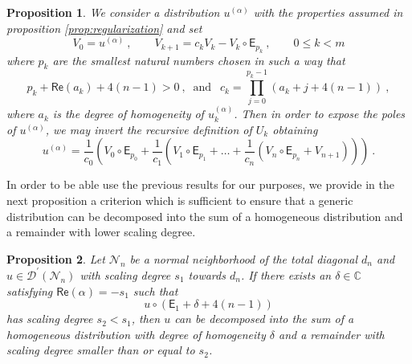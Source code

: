 \documentclass[11pt]{book}
\renewcommand{\Re}{\mathsf{Re}}
\newcommand{\Dcal}{\mathcal{D}}
\newcommand{\Ncal}{\mathcal{N}}
\newcommand{\Cbb}{\mathbb{C}}
\newcommand{\Esf}{\mathsf{E}}
\theoremstyle{break}
\newtheorem{proposition}{Proposition}[chapter]
\begin{document}
\begin{proposition}\label{prop:expose_poles}
We consider a distribution $u^{(\alpha)}$ with the properties assumed in proposition \ref{prop:regularization} and set
%
\begin{equation*}
V_0 = u^{(\alpha)} \ , \qquad V_{k+1} = c_k V_k - V_k \circ \Esf_{p_k} \ , \qquad 0 \leq k < m 
\end{equation*}
%
where $p_k$ are the smallest natural numbers chosen in such a way that 
%
\begin{equation*}
p_k+\Re(a_k)+4(n-1)>0 \ , \ \mbox{ and } \ \ c_k = \prod_{j=0}^{p_k-1} \left(a_k+j+4(n-1)\right) \ ,
\end{equation*}
%
where $a_k$ is the degree of homogeneity of $u^{(\alpha)}_k$. Then in order to expose the poles of $u^{(\alpha)}$, we may invert the recursive definition of $U_k$ obtaining
%
\begin{equation*}
u^{(\alpha)} = \frac{1}{c_0} \left( V_0\circ \Esf_{p_0} +  \frac{1}{c_1} \left( V_1 \circ \Esf_{p_1} +\dots + \frac{1}{c_n} \left( V_n \circ \Esf_{p_n} + V_{n+1} \right) \right) \right) \ .
\end{equation*}
%
\end{proposition}


In order to be able use the previous results for our purposes, we provide in the next proposition a criterion which is sufficient to ensure that a generic distribution can be decomposed into the sum of a homogeneous distribution and a remainder with lower scaling degree. 

\begin{proposition}\label{prop:set}
Let $\Ncal_n$ be a normal neighborhood of the total diagonal $d_n$ and $u \in \Dcal^\prime(\Ncal_n)$ with scaling degree $s_1$ towards $d_n$. If there exists an $\delta\in\Cbb$ satisfying $\Re(\alpha)=-s_1$ such that
%
\begin{equation*}
u\circ(\Esf_1+\delta+4(n-1)) 
\end{equation*}
%
has scaling degree $s_2 < s_1$, then $u$ can be decomposed into the sum of a homogeneous distribution with degree of homogeneity $\delta$ and a remainder with scaling degree smaller than or equal to $s_2$.
\end{proposition}
\end{document}
